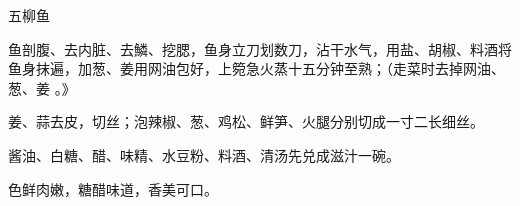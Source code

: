 \begin{recipe}{五柳鱼}

\ingredients


\cooking

\step 鱼剖腹、去内脏、去鱗、挖腮，鱼身立刀划数刀，沾干水气，用盐、胡椒、料酒将
鱼身抹遍，加葱、姜用网油包好，上箢急火蒸十五分钟至熟；（走菜时去掉网油、葱、姜
。》

\step 姜、蒜去皮，切丝；泡辣椒、葱、鸡松、鲜笋、火腿分别切成一寸二长细丝。

\step 酱油、白糖、醋、味精、水豆粉、料酒、清汤先兑成滋汁一碗。

\features

色鲜肉嫩，糖醋味道，香美可口。

\end{recipe}

